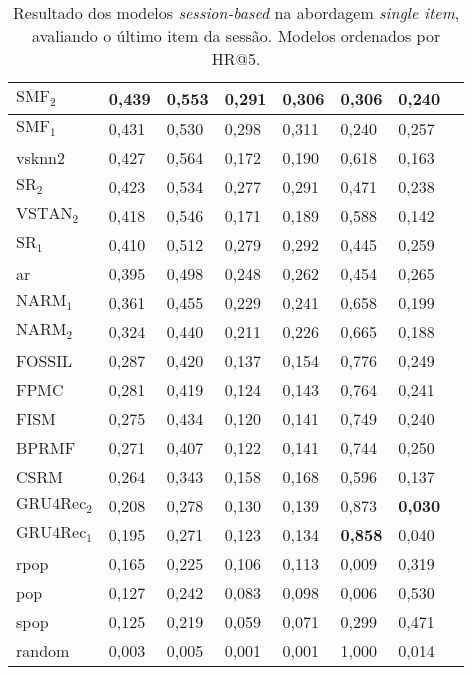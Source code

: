 \begin{table}[htbp]
\begin{tabular}{|l|l|l|l|l|l|l|l|}
      \hline
      $\text{SMF}_2$ & 0,439 & 0,553 & 0,291 & 0,306 & 0,306 & 0,240 \\
      \hline
      $\text{SMF}_1$ & 0,431 & 0,530 & 0,298 & 0,311 & 0,240 & 0,257 \\
      \hline
      vsknn2 & 0,427 & 0,564 & 0,172 & 0,190 & 0,618 & 0,163 \\
      \hline
      $\text{SR}_2$ & 0,423 & 0,534 & 0,277 & 0,291 & 0,471 & 0,238 \\
     \hline
      $\text{VSTAN}_2$ & 0,418 & 0,546 & 0,171 & 0,189 & 0,588 & 0,142 \\
      \hline
      $\text{SR}_1$ & 0,410 & 0,512 & 0,279 & 0,292 & 0,445 & 0,259 \\
      \hline
      ar & 0,395 & 0,498 & 0,248 & 0,262 & 0,454 & 0,265 \\
      \hline 
      $\text{NARM}_1$ & 0,361 & 0,455 & 0,229 & 0,241 & 0,658 & 0,199 \\
      \hline
      $\text{NARM}_2$ & 0,324 & 0,440 & 0,211 & 0,226 & 0,665 & 0,188 \\
      \hline
      FOSSIL & 0,287 & 0,420 & 0,137 & 0,154 & 0,776 & 0,249 \\
      \hline
      FPMC & 0,281 & 0,419 & 0,124 & 0,143 & 0,764 & 0,241 \\
      \hline
      FISM & 0,275 & 0,434 & 0,120 & 0,141 & 0,749 & 0,240 \\
      \hline
      BPRMF & 0,271 & 0,407 & 0,122 & 0,141 & 0,744 & 0,250 \\
      \hline
      CSRM & 0,264 & 0,343 & 0,158 & 0,168 & 0,596 & 0,137  \\ 
      \hline
      $\text{GRU4Rec}_2$ & 0,208 & 0,278 & 0,130 & 0,139 & 0,873 & \textbf{0,030}  \\
      \hline
      $\text{GRU4Rec}_1$ & 0,195 & 0,271 & 0,123 & 0,134 & \textbf{0,858} & 0,040  \\
      \hline
      rpop & 0,165 & 0,225 & 0,106 & 0,113 & 0,009 & 0,319 \\
      \hline
      pop & 0,127 & 0,242 & 0,083 & 0,098 & 0,006 & 0,530 \\
      \hline
      spop & 0,125 & 0,219 & 0,059 & 0,071 & 0,299 & 0,471 \\
      \hline
      random & 0,003 & 0,005 & 0,001 & 0,001 & 1,000 & 0,014 \\
      \hline
      \end{tabular}
      \label{tab:results_last_item}
    \caption{Resultado dos modelos \textit{session-based} na abordagem
    \textit{single item}, avaliando o último item da sessão. Modelos ordenados por HR@5. }
  \end{table}

